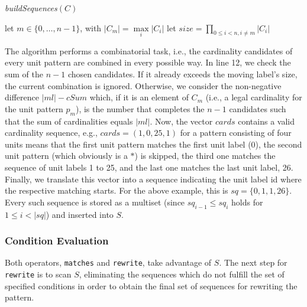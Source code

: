 \documentclass{sig-alternate}
\newcommand{\ic}[1]{\textit{#1}}
\begin{document}
\begin{algorithm}[ht]
  \caption{\label{alg:buildsequences}\ic{buildSequences$(C)$}}
    let $m\in \{0,\dots,n-1\}$, with $\left|C_m\right|=\max\limits_i \left|C_i\right|$\;
    let $size=\prod_{0\leq i<n,i\neq m}\left|C_i\right|$\;
\end{algorithm}

The algorithm performs a combinatorial task, i.e., the cardinality candidates of every unit pattern are combined in every possible way. In line 12, we check the sum of the $n-1$ chosen candidates. If it already exceeds the moving label's size, the current combination is ignored. Otherwise, we consider the non-negative difference $\left|ml\right|-cSum$ which, if it is an element of $C_m$ (i.e., a legal cardinality for the unit pattern $p_m$), is the number that completes the $n-1$ candidates such that the sum of cardinalities equals $\left|ml\right|$. Now, the vector $cards$ contains a valid cardinality sequence, e.g., $cards=(1,0,25,1)$ for a pattern consisting of four units means that the first unit pattern matches the first unit label (0), the second unit pattern (which obviously is a $\ast$) is skipped, the third one matches the sequence of unit labels 1 to 25, and the last one matches the last unit label, 26. Finally, we translate this vector into a sequence indicating the unit label id where the respective matching starts. For the above example, this is $sq=\{0,1,1,26\}$. Every such sequence is stored as a multiset (since $sq_{i-1}\leq sq_i$ holds for $1\leq i<\left|sq\right|$) and inserted into $S$.

\subsubsection{Condition Evaluation}\label{sec:condition evaluation}
Both operators, \texttt{matches} and \texttt{rewrite}, take advantage of $S$. The next step for \texttt{rewrite} is to scan $S$, eliminating the sequences which do not fulfill the set of specified conditions in order to obtain the final set of sequences for rewriting the pattern.
\end{document}
